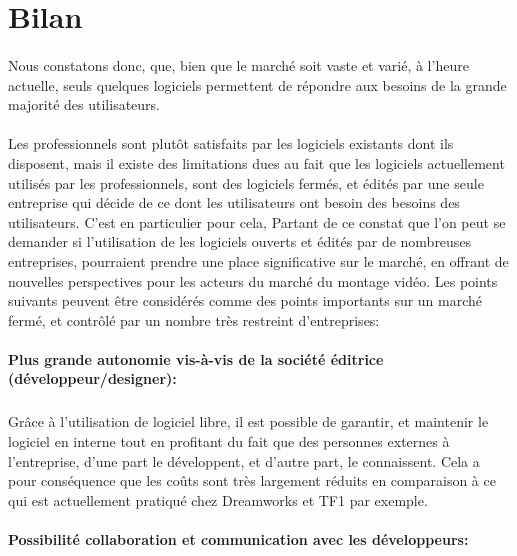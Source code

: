 \newpage

\section {Bilan}

\paragraph { }

Nous constatons donc, que, bien que le marché soit vaste et varié,
à l'heure actuelle, seuls quelques logiciels permettent de répondre
aux besoins de la grande majorité des utilisateurs.

\paragraph{}

Les professionnels sont plutôt satisfaits par les logiciels existants
dont ils disposent, mais il existe des limitations dues au fait
que les logiciels actuellement utilisés par les professionnels,
sont des logiciels fermés, et édités par une seule entreprise
qui décide de ce dont les utilisateurs ont besoin des besoins des
utilisateurs. C'est en particulier pour cela, Partant de ce constat
que l'on peut se demander si l'utilisation de les logiciels ouverts et
édités par de nombreuses entreprises, pourraient prendre une place
significative sur le marché, en offrant de nouvelles perspectives pour
les acteurs du marché du montage vidéo. Les points suivants peuvent
être considérés comme des points importants sur un marché fermé,
et contrôlé par un nombre très restreint d'entreprises:

\paragraph{Plus grande autonomie vis-à-vis de la société éditrice
(développeur/designer):}

  \subparagraph{ }

    Grâce à l'utilisation de logiciel libre, il est possible de
    garantir, et maintenir le logiciel en interne tout en profitant
    du fait que des personnes externes à l'entreprise, d'une part
    le développent, et d'autre part, le connaissent. Cela a pour
    conséquence que les coûts sont très largement réduits en
    comparaison à ce qui est actuellement pratiqué chez Dreamworks
    et TF1 par  exemple.

\paragraph{Possibilité collaboration et communication avec les
développeurs:}

